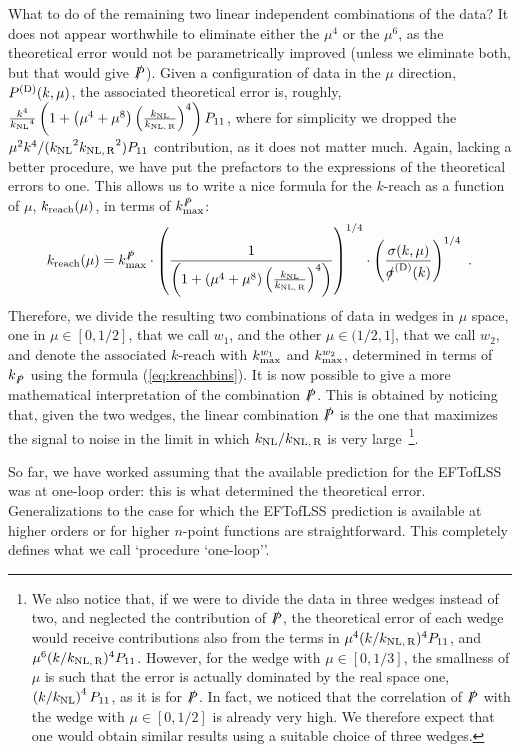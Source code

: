 \documentclass[12pt,a4paper]{article}
\def\PA{\slashed{P}}
\renewcommand{\(}{\left(}
\renewcommand{\)}{\right)}
\def\be{\begin{equation}}
\def\ee{\end{equation}}
\def\knl{{k_{\rm NL}}}
\def\knlr{{k_{\rm NL,\,R}}}
\begin{document}
What to do of the remaining two linear independent combinations of the data? It does not appear worthwhile to eliminate either the $\mu^4$ or the $\mu^6$, as the theoretical error would not be parametrically improved (unless we eliminate both, but that would give $\PA$). Given a configuration of data in the $\mu$ direction, $P^{\rm (D)}(k,\mu)$, the associated theoretical error is, roughly, $\frac{k^4}{\knl^4}\left(1+\left(\mu^4+\mu^8\right)\left(\frac{\knl}{\knlr}\right)^4\right)P_{11}$, where for simplicity we dropped the $\mu^2 k^4/(\knl^2\knlr^2)P_{11}$ contribution, as it does not matter much. Again, lacking a better procedure, we have put the prefactors to the expressions of the theoretical errors to one. This allows us to write a nice formula for the $k$-reach as a function of $\mu$, $k_{\rm reach}(\mu)$, in terms of $k_{\rm max}^\slashed{P}$:
\be\label{eq:kreachbins}
k_{\rm reach}(\mu)=k_{\rm max}^\slashed{P}\cdot\left(\frac{1}{\left(1+\left(\mu^4+\mu^8\right)\left(\frac{\knl}{\knlr}\right)^4\right)}\right)^{1/4} \cdot\left(\frac{\sigma(k,\mu)}{\slashed{\sigma}^{\rm (D)}(k)}\right)^{1/4}\ .
\ee
Therefore, we divide the resulting two combinations of data in wedges in $\mu$ space, one in $\mu\in[0,1/2]$, that we call $w_1$, and the other $\mu\in(1/2,1]$, that we call $w_2$, and denote the associated $k$-reach with {$k_{\rm max}^{w_1}$ and $k_{\rm max}^{w_2}$}, determined in terms of $k_{\slashed{P}}$ using the formula (\ref{eq:kreachbins}).  It is now possible to give a more mathematical interpretation of the combination $\PA$. This is obtained by noticing that, given the two wedges, the linear combination $\PA$ is the one that maximizes the signal to noise in the limit in which $\knl/\knlr$ is very large~\footnote{We also notice that, if we were to divide the data in three wedges instead of two, and neglected the contribution of $\PA$, the theoretical error of each wedge would receive contributions also from the terms in $\mu^4(k/ \knlr)^4 P_{11}$, and $\mu^6(k/ \knlr)^4 P_{11}$. However, for the wedge with $\mu\in[0,1/3]$, the smallness of $\mu$ is such that the error is actually dominated by the real space one, $\left(k/\knl\right)^4P_{11}$, as it is for $\PA$. In fact, we noticed that the correlation of $\PA$ with the wedge with $\mu\in[0,1/2]$ is already very high. We therefore expect that one would obtain similar results using a suitable choice of three wedges.}.

So far, we have worked assuming that the available prediction for the EFTofLSS was at one-loop order: this is what determined the theoretical error. Generalizations to the case {for which} the EFTofLSS prediction is available at higher orders or for higher $n$-point functions {are} straightforward.  This completely defines what we call `procedure `one-loop''.
\end{document}
